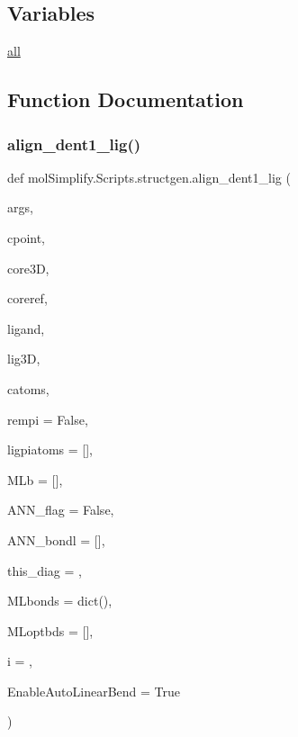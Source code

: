 \subsection*{Variables}
\begin{DoxyCompactItemize}
\item 
\hyperlink{namespacemolSimplify_1_1Scripts_1_1structgen_a2ef014c1f2b0eae8ccc7784c704bdfd9}{all}
\end{DoxyCompactItemize}


\subsection{Function Documentation}
\mbox{\label{namespacemolSimplify_1_1Scripts_1_1structgen_a91f6c3dc244887d2e71cdfa122ee7993}} 
\subsubsection{\texorpdfstring{align\+\_\+dent1\+\_\+lig()}{align\_dent1\_lig()}}
{\footnotesize\ttfamily def mol\+Simplify.\+Scripts.\+structgen.\+align\+\_\+dent1\+\_\+lig (\begin{DoxyParamCaption}\item[{}]{args,  }\item[{}]{cpoint,  }\item[{}]{core3D,  }\item[{}]{coreref,  }\item[{}]{ligand,  }\item[{}]{lig3D,  }\item[{}]{catoms,  }\item[{}]{rempi = {\ttfamily False},  }\item[{}]{ligpiatoms = {\ttfamily \mbox{[}\mbox{]}},  }\item[{}]{M\+Lb = {\ttfamily \mbox{[}\mbox{]}},  }\item[{}]{A\+N\+N\+\_\+flag = {\ttfamily False},  }\item[{}]{A\+N\+N\+\_\+bondl = {\ttfamily \mbox{[}\mbox{]}},  }\item[{}]{this\+\_\+diag = {},  }\item[{}]{M\+Lbonds = {\ttfamily dict()},  }\item[{}]{M\+Loptbds = {\ttfamily \mbox{[}\mbox{]}},  }\item[{}]{i = {},  }\item[{}]{Enable\+Auto\+Linear\+Bend = {\ttfamily True} }\end{DoxyParamCaption})}




